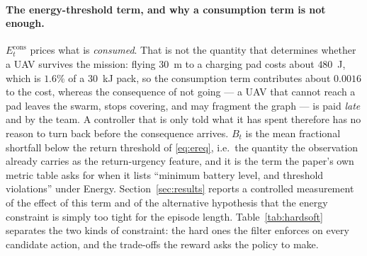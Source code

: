 \documentclass[conference]{IEEEtran}
\begin{document}
\paragraph{The energy-threshold term, and why a consumption term is not
enough.} $E_t^{\mathrm{cons}}$ prices what is \emph{consumed}. That is not
the quantity that determines whether a UAV survives the mission: flying
$30$~m to a charging pad costs about $480$~J, which is $1.6\%$ of a
$30$~kJ pack, so the consumption term contributes about $0.0016$ to the
cost, whereas the consequence of not going --- a UAV that cannot reach a
pad leaves the swarm, stops covering, and may fragment the graph --- is paid
\emph{late} and by the team. A controller that is only told what it has
spent therefore has no reason to turn back before the consequence arrives.
$B_t$ is the mean fractional shortfall below the return threshold of
\eqref{eq:ereq}, i.e.\ the quantity the observation already carries as the
return-urgency feature, and it is the term the paper's own metric table
asks for when it lists ``minimum battery level, and threshold violations''
under Energy. Section~\ref{sec:results} reports a controlled measurement of
the effect of this term and of the alternative hypothesis that the energy
constraint is simply too tight for the episode length. Table~\ref{tab:hardsoft} separates the two kinds of constraint: the hard ones the filter enforces on every candidate action, and the trade-offs the reward asks the policy to make.
\end{document}
